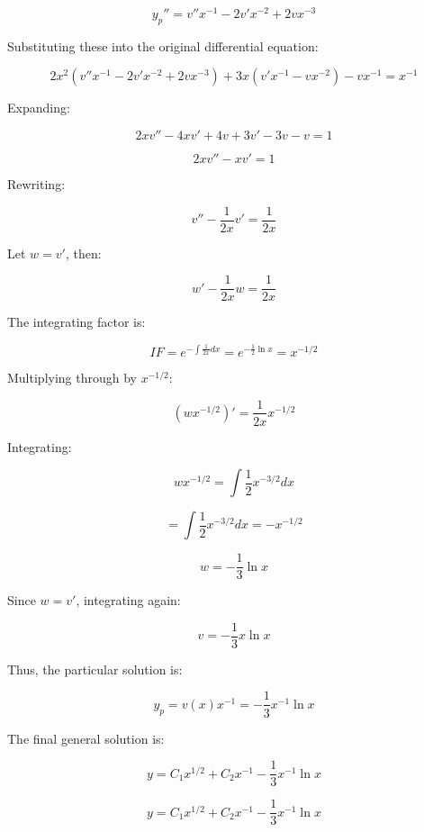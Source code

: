 \documentclass[12pt]{article}
\begin{document}
\begin{enumerate}
\[
y_p'' = v'' x^{-1} - 2 v' x^{-2} + 2 v x^{-3}
\]

Substituting these into the original differential equation:

\[
2x^2 (v'' x^{-1} - 2 v' x^{-2} + 2 v x^{-3}) + 3x (v' x^{-1} - v x^{-2}) - v x^{-1} = x^{-1}
\]

Expanding:

\[
2x v'' - 4x v' + 4v + 3v' - 3v - v = 1
\]

\[
2x v'' - x v' = 1
\]

Rewriting:

\[
v'' - \frac{1}{2x} v' = \frac{1}{2x}
\]

Let \( w = v' \), then:

\[
w' - \frac{1}{2x} w = \frac{1}{2x}
\]

The integrating factor is:

\[
IF = e^{-\int \frac{1}{2x} dx} = e^{-\frac{1}{2} \ln x} = x^{-1/2}
\]

Multiplying through by \( x^{-1/2} \):

\[
(w x^{-1/2})' = \frac{1}{2x} x^{-1/2}
\]

Integrating:

\[
w x^{-1/2} = \int \frac{1}{2} x^{-3/2} dx
\]

\[
= \int \frac{1}{2} x^{-3/2} dx = -x^{-1/2}
\]

\[
w = -\frac{1}{3} \ln x
\]

Since \( w = v' \), integrating again:

\[
v = -\frac{1}{3} x \ln x
\]

Thus, the particular solution is:

\[
y_p = v(x) x^{-1} = -\frac{1}{3} x^{-1} \ln x
\]

The final general solution is:

\[
y = C_1 x^{1/2} + C_2 x^{-1} - \frac{1}{3} x^{-1} \ln x
\]

\[
y = C_1 x^{1/2} + C_2 x^{-1} - \frac{1}{3} x^{-1} \ln x
\]

\end{enumerate}
\end{document}

